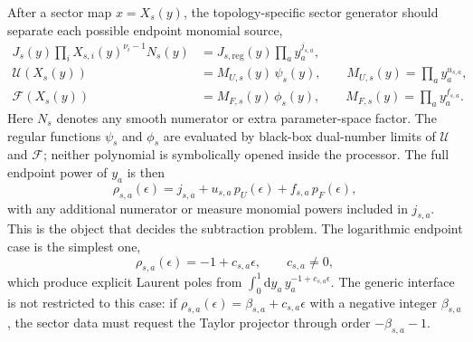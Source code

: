 \documentclass[11pt]{article}
\newcommand{\dd}{\mathrm d}
\newcommand{\eps}{\epsilon}
\newcommand{\U}{\mathcal U}
\newcommand{\F}{\mathcal F}
\begin{document}
After a sector map \(x=X_s(y)\), the topology-specific sector generator should
separate each possible endpoint monomial source,
\begin{align}
  J_s(y)\prod_i X_{s,i}(y)^{\nu_i-1}N_s(y)
  &=
  J_{s,\mathrm{reg}}(y)
  \prod_a y_a^{j_{s,a}},
  \\
  \U(X_s(y))
  &=
  M_{U,s}(y)\,\psi_s(y),
  \qquad
  M_{U,s}(y)=\prod_a y_a^{u_{s,a}},
  \\
  \F(X_s(y))
  &=
  M_{F,s}(y)\,\phi_s(y),
  \qquad
  M_{F,s}(y)=\prod_a y_a^{f_{s,a}}.
\end{align}
Here \(N_s\) denotes any smooth numerator or extra parameter-space factor.  The
regular functions \(\psi_s\) and \(\phi_s\) are evaluated by black-box
dual-number limits of \(\U\) and \(\F\); neither polynomial is symbolically
opened inside the processor.  The full endpoint power of \(y_a\) is then
\begin{equation}
  \rho_{s,a}(\eps)
  =
  j_{s,a}
  +
  u_{s,a}\,p_U(\eps)
  +
  f_{s,a}\,p_F(\eps),
\end{equation}
with any additional numerator or measure monomial powers included in
\(j_{s,a}\).  This is the object that decides the subtraction problem.  The
logarithmic endpoint case is the simplest one,
\begin{equation}
  \rho_{s,a}(\eps)=-1+c_{s,a}\eps,
  \qquad
  c_{s,a}\neq0,
\end{equation}
which produce explicit Laurent poles from
\(\int_0^1\dd y_a\,y_a^{-1+c_{s,a}\eps}\).  The generic interface is not
restricted to this case: if
\(\rho_{s,a}(\eps)=\beta_{s,a}+c_{s,a}\eps\) with a negative integer
\(\beta_{s,a}\), the sector data must request the Taylor projector through
order \(-\beta_{s,a}-1\).
\end{document}
